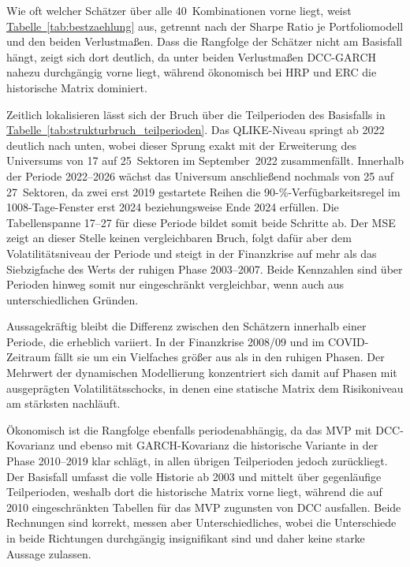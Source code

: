 



Wie oft welcher Schätzer über alle 40~Kombinationen vorne liegt, weist \hyperref[tab:bestzaehlung]{Tabelle~\ref*{tab:bestzaehlung}} aus, getrennt nach der Sharpe Ratio je Portfoliomodell und den beiden Verlustmaßen.
Dass die Rangfolge der Schätzer nicht am Basisfall hängt, zeigt sich dort deutlich, da unter beiden Verlustmaßen DCC-GARCH nahezu durchgängig vorne liegt, während ökonomisch bei HRP und ERC die historische Matrix dominiert.



Zeitlich lokalisieren lässt sich der Bruch über die Teilperioden des Basisfalls in \hyperref[tab:strukturbruch_teilperioden]{Tabelle~\ref*{tab:strukturbruch_teilperioden}}.
Das QLIKE-Niveau springt ab 2022 deutlich nach unten, wobei dieser Sprung exakt mit der Erweiterung des Universums von 17 auf 25~Sektoren im September~2022 zusammenfällt.
Innerhalb der Periode 2022--2026 wächst das Universum anschließend nochmals von 25 auf 27~Sektoren, da zwei erst 2019 gestartete Reihen die 90-\%-Verfügbarkeitsregel im 1008-Tage-Fenster erst 2024 beziehungsweise Ende 2024 erfüllen.
Die Tabellenspanne 17--27 für diese Periode bildet somit beide Schritte ab.
Der MSE zeigt an dieser Stelle keinen vergleichbaren Bruch, folgt dafür aber dem Volatilitätsniveau der Periode und steigt in der Finanzkrise auf mehr als das Siebzigfache des Werts der ruhigen Phase 2003--2007.
Beide Kennzahlen sind über Perioden hinweg somit nur eingeschränkt vergleichbar, wenn auch aus unterschiedlichen Gründen.



Aussagekräftig bleibt die Differenz zwischen den Schätzern innerhalb einer Periode, die erheblich variiert.
In der Finanzkrise 2008/09 und im COVID-Zeitraum fällt sie um ein Vielfaches größer aus als in den ruhigen Phasen.
Der Mehrwert der dynamischen Modellierung konzentriert sich damit auf Phasen mit ausgeprägten Volatilitätsschocks, in denen eine statische Matrix dem Risikoniveau am stärksten nachläuft.

Ökonomisch ist die Rangfolge ebenfalls periodenabhängig, da das MVP mit DCC-Kovarianz und ebenso mit GARCH-Kovarianz die historische Variante in der Phase 2010--2019 klar schlägt, in allen übrigen Teilperioden jedoch zurückliegt.
Der Basisfall umfasst die volle Historie ab 2003 und mittelt über gegenläufige Teilperioden, weshalb dort die historische Matrix vorne liegt, während die auf 2010 eingeschränkten Tabellen für das MVP zugunsten von DCC ausfallen.
Beide Rechnungen sind korrekt, messen aber Unterschiedliches, wobei die Unterschiede in beide Richtungen durchgängig insignifikant sind und daher keine starke Aussage zulassen.

